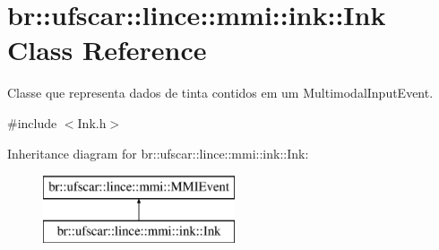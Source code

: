 \hypertarget{classbr_1_1ufscar_1_1lince_1_1mmi_1_1ink_1_1Ink}{
\section{br::ufscar::lince::mmi::ink::Ink Class Reference}
\label{classbr_1_1ufscar_1_1lince_1_1mmi_1_1ink_1_1Ink}
}


Classe que representa dados de tinta contidos em um MultimodalInputEvent.  




{\ttfamily \#include $<$Ink.h$>$}

Inheritance diagram for br::ufscar::lince::mmi::ink::Ink:\begin{figure}[H]
\begin{center}
\leavevmode
\includegraphics[height=2cm]{classbr_1_1ufscar_1_1lince_1_1mmi_1_1ink_1_1Ink}
\end{center}
\end{figure}
